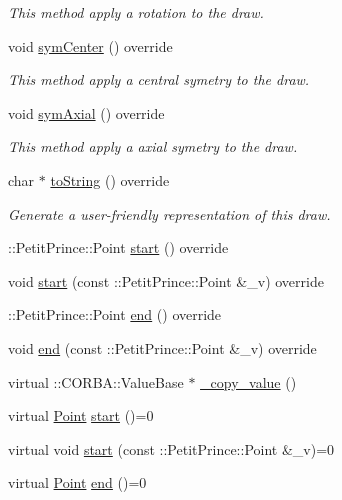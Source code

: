 \begin{DoxyCompactItemize}
\begin{DoxyCompactList}\small\item\em This method apply a rotation to the draw. \end{DoxyCompactList}\item 
void \hyperlink{class_line_a963afc932982e706383fd82263978c38}{sym\+Center} () override
\begin{DoxyCompactList}\small\item\em This method apply a central symetry to the draw. \end{DoxyCompactList}\item 
void \hyperlink{class_line_ad235ec549fdc4f7eee305becc1fefe8a}{sym\+Axial} () override
\begin{DoxyCompactList}\small\item\em This method apply a axial symetry to the draw. \end{DoxyCompactList}\item 
char $\ast$ \hyperlink{class_line_a12c0a83bdccfa79183c38a8b63e54b36}{to\+String} () override
\begin{DoxyCompactList}\small\item\em Generate a user-\/friendly representation of this draw. \end{DoxyCompactList}\item 
\+::Petit\+Prince\+::\+Point \hyperlink{class_line_a98203eecc32db053609ec4ed976c591e}{start} () override
\item 
void \hyperlink{class_line_a6d94c9e7708a0ea2bd8d23f90cd2880e}{start} (const \+::Petit\+Prince\+::\+Point \&\+\_\+v) override
\item 
\+::Petit\+Prince\+::\+Point \hyperlink{class_line_a0a63ba42fc17f9bcef9b26429fac7b05}{end} () override
\item 
void \hyperlink{class_line_a5555e7b5f8f6be8fd3b1fed0ce60ba85}{end} (const \+::Petit\+Prince\+::\+Point \&\+\_\+v) override
\item 
virtual \+::C\+O\+R\+B\+A\+::\+Value\+Base $\ast$ \hyperlink{class_line_a1394704db9b14feb758131900ad5d173}{\+\_\+copy\+\_\+value} ()
\item 
virtual \hyperlink{struct_point}{Point} \hyperlink{class_line_aaf3b5135f7b80df4a4882277a5b1b63f}{start} ()=0
\item 
virtual void \hyperlink{class_line_aa0fb946ffb5689f0eb08339a93ea76ed}{start} (const \+::Petit\+Prince\+::\+Point \&\+\_\+v)=0
\item 
virtual \hyperlink{struct_point}{Point} \hyperlink{class_line_ad69f4951e34588087edacf3dccb9205f}{end} ()=0

\end{DoxyCompactItemize}
